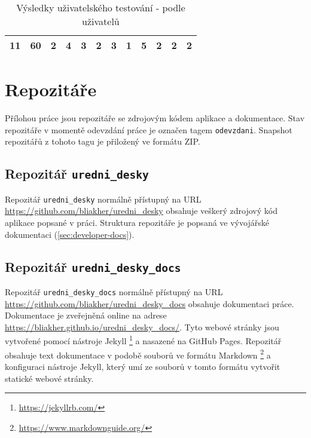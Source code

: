\documentclass[12pt,a4paper]{report}
\let\openright=\clearpage
\begin{document}
\begin{sidewaystable}
\begin{tabular}{|c|c|c|c|c|c|c|c|c|c|c|c|}
11                                                              & {\color[HTML]{EA4335} 60}                                                            & 2                                                            & 4                                                            & 3                                                            & 2                                                            & 3                                                            & 1                                                            & 5                                                            & 2                                                            & 2                                                            & 2                                                             \\ \hline
\end{tabular}
\caption{Výsledky uživatelského testování - podle uživatelů}
\label{table:vysledky2}
\end{sidewaystable}


\section{Repozitáře}

Přílohou práce jsou repozitáře se zdrojovým kódem aplikace a dokumentace. Stav repozitáře v momentě odevzdání práce je označen tagem \texttt{odevzdani}. Snapshot repozitářů z tohoto tagu je přiložený ve formátu ZIP.

\subsection{Repozitář \texttt{uredni\_desky}} \label{sub:repo1}

Repozitář \texttt{uredni\_desky} normálně přístupný na URL \url{https://github.com/bliakher/uredni_desky} obsahuje veškerý zdrojový kód aplikace popsané v práci. Struktura repozitáře je popsaná ve vývojářské dokumentaci (\autoref{sec:developer-docs}).

\subsection{Repozitář \texttt{uredni\_desky\_docs} \label{sub:repo2}}

Repozitář \texttt{uredni\_desky\_docs} normálně přístupný na URL \url{https://github.com/bliakher/uredni_desky_docs} obsahuje dokumentaci práce. Dokumentace je zveřejněná online na adrese \url{https://bliakher.github.io/uredni_desky_docs/}. Tyto webové stránky jsou vytvořené pomocí nástroje Jekyll \footnote{\url{https://jekyllrb.com/}} a nasazené na GitHub Pages. Repozitář obsahuje text dokumentace v podobě souborů ve formátu Markdown \footnote{\url{https://www.markdownguide.org/}} a konfiguraci nástroje Jekyll, který umí ze souborů v tomto formátu vytvořit statické webové stránky.

\openright
\end{document}
